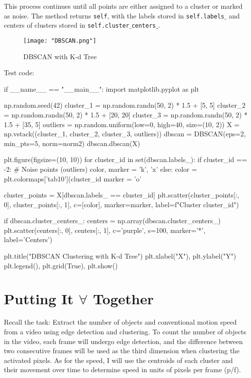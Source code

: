 \documentclass{article}
\begin{document}
	This process continues until all points are either assigned to a cluster or marked as noise. The method returns \texttt{self}, with the labels stored in \texttt{self.labels$\_$} and centers of clusters stored in \texttt{self.cluster$\_$centers$\_$}.

	\begin{figure}[H]
		\centering
		\texttt{[image: "DBSCAN.png"]}
		\caption{DBSCAN with K-d Tree}
	\end{figure}

	Test code:
	
	\begin{python}
if __name__ == "__main__":
	import matplotlib.pyplot as plt
	
	np.random.seed(42)
	cluster_1 = np.random.randn(50, 2) * 1.5 + [5, 5]
	cluster_2 = np.random.randn(50, 2) * 1.5 + [20, 20]
	cluster_3 = np.random.randn(50, 2) * 1.5 + [35, 5]
	outliers = np.random.uniform(low=0, high=40, size=(10, 2))
	X = np.vstack((cluster_1, cluster_2, cluster_3, outliers))
	dbscan = DBSCAN(eps=2, min_pts=5, norm=norm2)
	dbscan.dbscan(X)
	
	plt.figure(figsize=(10, 10))
	for cluster_id in set(dbscan.labels_):
		if cluster_id == -2:  # Noise points (outliers)
			color, marker = 'k', 'x'
		else:
			color = plt.colormaps['tab10'](cluster_id %
			marker = 'o'
	
		cluster_points = X[dbscan.labels_ == cluster_id]
		plt.scatter(cluster_points[:, 0], cluster_points[:, 1], 
					c=[color], marker=marker, label=f"Cluster {cluster_id}")	
	
	if dbscan.cluster_centers_:
		centers = np.array(dbscan.cluster_centers_)
		plt.scatter(centers[:, 0], centers[:, 1], c='purple', s=100, marker='*', label='Centers')
	
	plt.title("DBSCAN Clustering with K-d Tree")
	plt.xlabel("X"), plt.ylabel("Y")
	plt.legend(), plt.grid(True), plt.show()

	\end{python}
	
	\newpage
	\section{Putting It $\forall$ Together}
	
	Recall the task: Extract the number of objects and conventional motion speed from a video using edge detection and clustering. To count the number of objects in the video, each frame will undergo edge detection, and the difference between two consecutive frames will be used as the third dimension when clustering the activated pixels. As for the speed, I will use the centroids of each cluster and their movement over time to determine speed in units of pixels per frame (p/f). \\
	
\end{document}

